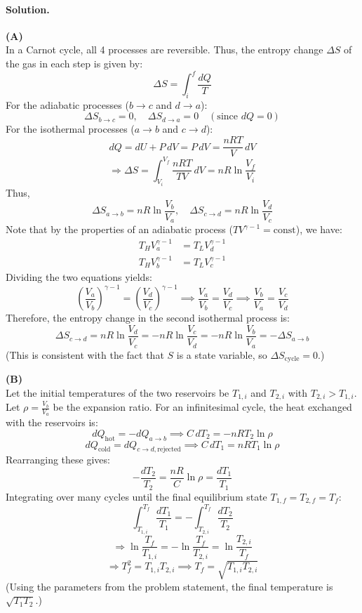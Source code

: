 \paragraph{Solution.}
\textbf{(A)} \\
In a Carnot cycle, all 4 processes are reversible. Thus, the entropy change $\Delta S$ of the gas in each step is given by:
\[ \Delta S = \int_{i}^{f} \frac{dQ}{T} \]
For the adiabatic processes ($b \to c$ and $d \to a$):
\[ \Delta S_{b \to c} = 0, \quad \Delta S_{d \to a} = 0 \quad (\text{since } dQ = 0) \]
For the isothermal processes ($a \to b$ and $c \to d$):
\[ dQ = dU + P\,dV = P\,dV = \frac{nRT}{V}\,dV \]
\[ \Rightarrow \Delta S = \int_{V_i}^{V_f} \frac{nRT}{TV}\,dV = nR \ln \frac{V_f}{V_i} \]
Thus,
\[ \Delta S_{a \to b} = nR \ln \frac{V_b}{V_a}, \quad \Delta S_{c \to d} = nR \ln \frac{V_d}{V_c} \]
Note that by the properties of an adiabatic process ($TV^{\gamma-1} = \text{const}$), we have:
\begin{align*}
T_H V_a^{\gamma-1} &= T_L V_d^{\gamma-1} \\
T_H V_b^{\gamma-1} &= T_L V_c^{\gamma-1}
\end{align*}
Dividing the two equations yields:
\[ \left(\frac{V_a}{V_b}\right)^{\gamma-1} = \left(\frac{V_d}{V_c}\right)^{\gamma-1} \implies \frac{V_a}{V_b} = \frac{V_d}{V_c} \implies \frac{V_b}{V_a} = \frac{V_c}{V_d} \]
Therefore, the entropy change in the second isothermal process is:
\[ \Delta S_{c \to d} = nR \ln \frac{V_d}{V_c} = -nR \ln \frac{V_c}{V_d} = -nR \ln \frac{V_b}{V_a} = -\Delta S_{a \to b} \]
(This is consistent with the fact that $S$ is a state variable, so $\Delta S_{\text{cycle}} = 0$.)

\vspace{1em}
\textbf{(B)} \\
Let the initial temperatures of the two reservoirs be $T_{1,i}$ and $T_{2,i}$ with $T_{2,i} > T_{1,i}$. Let $\rho = \frac{V_b}{V_a}$ be the expansion ratio. 
For an infinitesimal cycle, the heat exchanged with the reservoirs is:
\[ dQ_{\text{hot}} = -dQ_{a \to b} \implies C\,dT_2 = -nR T_2 \ln \rho \]
\[ dQ_{\text{cold}} = dQ_{c \to d, \text{rejected}} \implies C\,dT_1 = nR T_1 \ln \rho \]
Rearranging these gives:
\[ -\frac{dT_2}{T_2} = \frac{nR}{C}\ln \rho = \frac{dT_1}{T_1} \]
Integrating over many cycles until the final equilibrium state $T_{1,f} = T_{2,f} = T_f$:
\[ \int_{T_{1,i}}^{T_f} \frac{dT_1}{T_1} = -\int_{T_{2,i}}^{T_f} \frac{dT_2}{T_2} \]
\[ \Rightarrow \ln \frac{T_f}{T_{1,i}} = -\ln \frac{T_f}{T_{2,i}} = \ln \frac{T_{2,i}}{T_f} \]
\[ \Rightarrow T_f^2 = T_{1,i} T_{2,i} \implies T_f = \sqrt{T_{1,i} T_{2,i}} \]
(Using the parameters from the problem statement, the final temperature is $\sqrt{T_1 T_2}$.)

